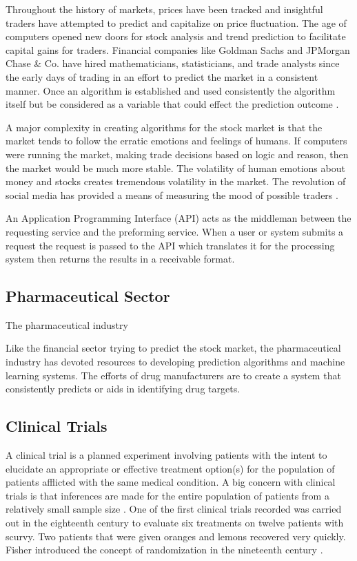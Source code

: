 \documentclass[sigconf]{acmart}
\begin{document}
Throughout the history of markets, prices have been tracked and insightful traders have attempted to predict and capitalize on price fluctuation. The age of computers opened new doors for stock analysis and trend prediction to facilitate capital gains for traders. Financial companies like Goldman Sachs and JPMorgan Chase \& Co. have hired mathematicians, statisticians, and trade analysts since the early days of trading in an effort to predict the market in a consistent manner. %
Once an algorithm is established and used consistently the algorithm itself but be considered as a variable that could effect the prediction outcome \cite{Hellstrom}. 

A major complexity in creating algorithms for the stock market is that the market tends to follow the erratic emotions and feelings of humans. If computers were running the market, making trade decisions based on logic and reason, then the market would be much more stable. The volatility of human emotions about money and stocks creates tremendous volatility in the market. The revolution of social media has provided a means of measuring the mood of possible traders \cite{BOLLEN}.

An Application Programming Interface (API) acts as the middleman between the requesting service and the preforming service. When a user or system submits a request the request is passed to the API which translates it for the processing system then returns the results in a receivable format. 


\subsection{Pharmaceutical Sector}
The pharmaceutical industry %

Like the financial sector trying to predict the stock market, the pharmaceutical industry has devoted resources to developing prediction algorithms and machine learning systems. The efforts of drug manufacturers are to create a system that consistently predicts or aids in identifying drug targets. %



\subsection{Clinical Trials}
A clinical trial is a planned experiment involving patients with the intent to elucidate an appropriate or effective treatment option(s) for the population of patients afflicted with the same medical condition. A big concern with clinical trials is that inferences are made for the entire population of patients from a relatively small sample size \cite{Pocock}. One of the first clinical trials recorded was carried out in the eighteenth century to evaluate six treatments on  twelve patients with scurvy. Two patients that were given oranges and lemons recovered very quickly. Fisher introduced the concept of randomization in the nineteenth century \cite{Friedman}.
\end{document}
